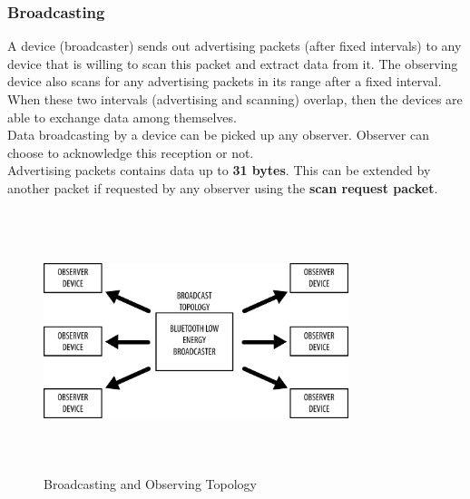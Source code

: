 \subsubsection{Broadcasting}
A device (broadcaster) sends out advertising packets (after fixed intervals) to any device that is willing to scan this packet and extract data from it. The observing device also scans for any advertising packets in its range after a fixed interval. When these two intervals (advertising and scanning) overlap, then the devices are able to exchange data among themselves.\\
Data broadcasting by a device can be picked up any observer. Observer can choose to acknowledge this reception or not.\\
Advertising packets contains data up to \textbf{31 bytes}. This can be extended by another packet if requested by any observer using the \textbf{scan request packet}.
\begin{figure}[ht]
	\centering
	\includegraphics[width=3.5in, height=3in]{images/broadcast_topology.png}
	\caption{Broadcasting and Observing Topology}
\end{figure}
